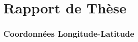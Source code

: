 \documentclass[11pt]{thesul}
\begin{document}
\DontWriteThisInToc   
\listoffigures

\WriteThisInToc
\FrameThisInToc
\NumberThisInToc
\part*{Rapport de Thèse}
\mainmatter





 






\Annexes

\section{Coordonnées Longitude-Latitude}

%






\NumberAbstractPages
\begin{ThesisAbstract}
 
\end{ThesisAbstract}
\end{document}
